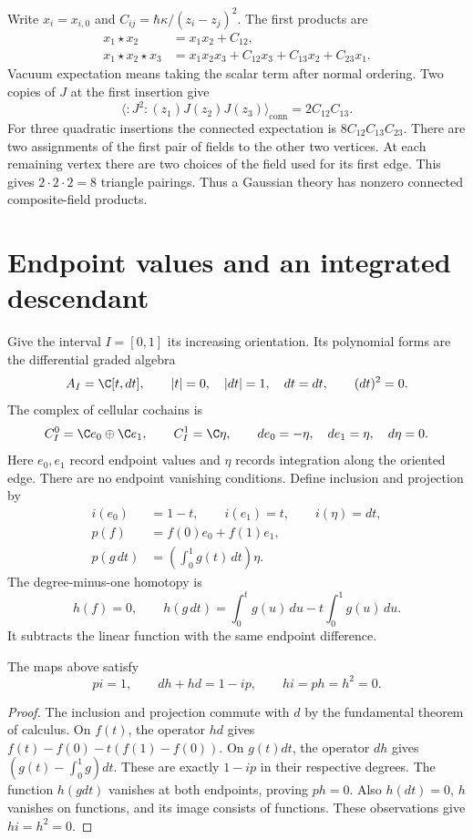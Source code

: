 Write $x_i=x_{i,0}$ and $C_{ij}=\hbar\kappa/(z_i-z_j)^2$.
The first products are
\begin{equation*}
 \begin{split}
 x_1\star x_2&=x_1x_2+C_{12},\\
 x_1\star x_2\star x_3
 &=x_1x_2x_3+C_{12}x_3+C_{13}x_2+C_{23}x_1.
 \end{split}
\end{equation*}
Vacuum expectation means taking the scalar term after normal ordering.
Two copies of $J$ at the first insertion give
\[
 \langle :J^2:(z_1)J(z_2)J(z_3)\rangle_{\mathrm{conn}}
   =2C_{12}C_{13}.
\]
For three quadratic insertions the connected expectation is
$8C_{12}C_{13}C_{23}$.  There are two assignments of the first pair
of fields to the other two vertices.  At each remaining vertex there
are two choices of the field used for its first edge.  This gives
$2\cdot2\cdot2=8$ triangle pairings.  Thus a Gaussian theory has
nonzero connected composite-field products.

\section{Endpoint values and an integrated descendant}

Give the interval $I=[0,1]$ its increasing orientation.  Its polynomial
forms are the differential graded algebra
\[
 A_I=\C[t,dt],\qquad |t|=0,\quad |dt|=1,\quad d t=dt,
 \qquad (dt)^2=0.
\]
The complex of cellular cochains is
\[
 C_I^0=\C e_0\oplus\C e_1,\qquad C_I^1=\C\eta,
 \qquad de_0=-\eta,\quad de_1=\eta,\quad d\eta=0.
\]
Here $e_0,e_1$ record endpoint values and $\eta$ records integration
along the oriented edge.  There are no endpoint vanishing conditions.
Define inclusion and projection by
\begin{equation*}
 \begin{aligned}
 i(e_0)&=1-t,\qquad i(e_1)=t,\qquad i(\eta)=dt,\\
 p(f)&=f(0)e_0+f(1)e_1,\\
 p(g\,dt)&=\left(\int_0^1g(t)\,dt\right)\eta.
 \end{aligned}
\end{equation*}
The degree-minus-one homotopy is
\begin{equation*}
 h(f)=0,\qquad
 h(g\,dt)=\int_0^t g(u)\,du-t\int_0^1g(u)\,du.
\end{equation*}
It subtracts the linear function with the same endpoint difference.

\begin{lemma}
\label{lem:interval-contraction}
The maps above satisfy
\[
 pi=1,\qquad dh+hd=1-ip,\qquad hi=ph=h^2=0.
\]
\end{lemma}
\begin{proof}
The inclusion and projection commute with $d$ by the fundamental theorem
of calculus.  On $f(t)$, the operator $hd$ gives
$f(t)-f(0)-t(f(1)-f(0))$.  On $g(t)dt$, the operator $dh$ gives
$(g(t)-\int_0^1g)dt$.  These are exactly $1-ip$ in their respective
degrees.  The function $h(gdt)$ vanishes at both endpoints, proving
$ph=0$.  Also $h(dt)=0$, $h$ vanishes on functions, and its image
consists of functions.  These observations give $hi=h^2=0$.
\end{proof}

